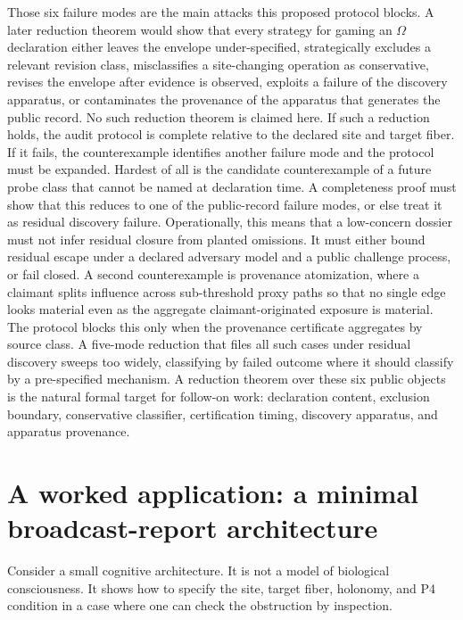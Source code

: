 \documentclass[11pt]{article}
\begin{document}
Those six failure modes are the main attacks this proposed protocol blocks.
A later reduction theorem would show that every strategy for gaming an
$\Omega$ declaration either leaves the envelope under-specified, strategically
excludes a relevant revision class, misclassifies a site-changing operation as
conservative, revises the envelope after evidence is observed, exploits a
failure of the discovery apparatus, or contaminates the provenance of the
apparatus that generates the public record.
No such reduction theorem is claimed here.
If such a reduction holds, the audit protocol is complete relative to the
declared site and target fiber.
If it fails, the counterexample identifies another failure mode and the
protocol must be expanded.
Hardest of all is the candidate counterexample of a future probe class that
cannot be named at declaration time.
A completeness proof must show that this reduces to one of the public-record
failure modes, or else treat it as residual discovery failure.
Operationally, this means that a low-concern dossier must not infer residual
closure from planted omissions.
It must either bound residual escape under a declared adversary model and a
public challenge process, or fail closed.
A second counterexample is provenance atomization, where a claimant splits
influence across sub-threshold proxy paths so that no single edge looks material
even as the aggregate claimant-originated exposure is material. The protocol
blocks this only when the provenance certificate aggregates by source class. A
five-mode reduction that files all such cases under residual discovery sweeps too
widely, classifying by failed outcome where it should classify by a
pre-specified mechanism.
A reduction theorem over these six public objects is the natural formal target
for follow-on work: declaration content, exclusion boundary, conservative
classifier, certification timing, discovery apparatus, and apparatus
provenance.

\section{A worked application: a minimal broadcast-report architecture}
\label{sec:worked}

Consider a small cognitive architecture. It is not a model of
biological consciousness. It shows how to specify the site, target fiber,
holonomy, and P4 condition in a case where one can check the obstruction by
inspection.
\end{document}

